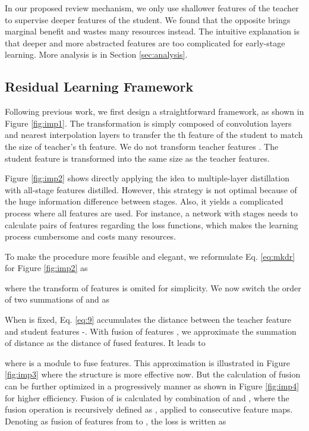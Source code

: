 \documentclass[final]{cvpr}
\begin{document}
In our proposed review mechanism, we only use shallower features of the teacher to supervise deeper features of the student. We found that the opposite brings marginal benefit and wastes many resources instead. The intuitive explanation is that deeper and more abstracted features are too complicated for early-stage learning. More analysis is in Section \ref{sec:analysis}.




\subsection{Residual Learning Framework}
\label{sec:rlf}
Following previous work, we first design a straightforward framework, as shown in Figure \ref{fig:imp1}. 
The transformation  is simply composed of convolution layers and nearest interpolation layers to transfer the th feature of the student to match the size of teacher's th feature. We do not transform teacher features . 
The student feature is transformed into the same size as the teacher features. 

Figure \ref{fig:imp2} shows directly applying the idea to multiple-layer distillation with all-stage features distilled. However, this strategy is not optimal because of the huge information difference between stages. 
Also, it yields a complicated process where all features are used. For instance, a network with  stages needs to calculate  pairs of features regarding the loss functions, which makes the learning process cumbersome and costs many resources.

To make the procedure more feasible and elegant, we reformulate Eq. \eqref{eq:mkdr} for Figure \ref{fig:imp2} as

where the transform of features is omited for simplicity. 
We now switch the order of two summations of  and  as

When  is fixed, Eq. \eqref{eq:9} accumulates the distance between the teacher feature  and student features -. With fusion of features \cite{exfuse,fpn}, we approximate the summation of distance as the distance of fused features. It leads to

where  is a module to fuse features. This approximation is illustrated in Figure \ref{fig:imp3} where the structure is more effective now. But the calculation of fusion can be further optimized in a progressively manner as shown in Figure \ref{fig:imp4} for higher efficiency. Fusion of  is calculated by combination of  and , where the fusion operation is recursively defined as , applied to consecutive feature maps. Denoting  as fusion of features from  to , the loss is written as 
\end{document}
